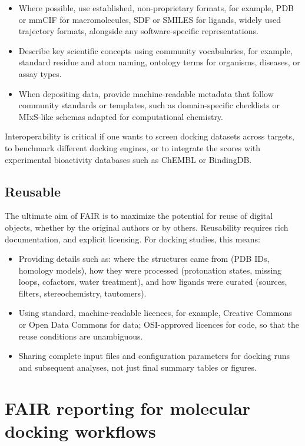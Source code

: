 \documentclass[12pt]{article}
\begin{document}
\begin{itemize}
  \item Where possible, use established, non-proprietary formats, for example, PDB or mmCIF for macromolecules, SDF or SMILES for ligands, widely used trajectory formats, alongside any software-specific representations.
  \item Describe key scientific concepts using community vocabularies, for example, standard residue and atom naming, ontology terms for organisms, diseases, or assay types.
  \item When depositing data, provide machine-readable metadata that follow community standards or templates, such as domain-specific checklists or MIxS-like schemas adapted for computational chemistry.
\end{itemize}

Interoperability is critical if one wants to screen docking datasets across targets, to benchmark different docking engines, or to integrate the scores with experimental bioactivity databases such as ChEMBL or BindingDB.

\subsection{Reusable}

The ultimate aim of FAIR is to maximize the potential for reuse of digital objects, whether by the original authors or by others.\cite{CH12_wilkinson2016FAIR,CH12_goFairPrinciples,CH12_nnlmFAIR} Reusability requires rich documentation, and explicit licensing. For docking studies, this means:

\begin{itemize}
  \item Providing details such as: where the structures came from (PDB IDs, homology models), how they were processed (protonation states, missing loops, cofactors, water treatment), and how ligands were curated (sources, filters, stereochemistry, tautomers).
  \item Using standard, machine-readable licences, for example, Creative Commons or Open Data Commons for data; OSI-approved licences for code, so that the reuse conditions are unambiguous.
  \item Sharing complete input files and configuration parameters for docking runs and subsequent analyses, not just final summary tables or figures.
\end{itemize}


\section{FAIR reporting for molecular docking workflows}
\end{document}
